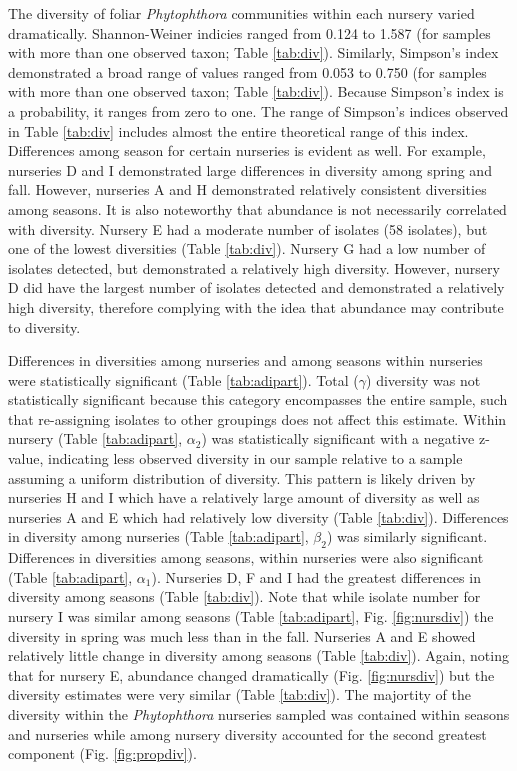 \documentclass[12pt]{article}
\begin{document}
The diversity of foliar \emph{Phytophthora} communities within each nursery varied dramatically.  Shannon-Weiner indicies ranged from 0.124 to 1.587 (for samples with more than one observed taxon; Table \ref{tab:div}).  Similarly, Simpson's index demonstrated a broad range of values ranged from 0.053 to 0.750 (for samples with more than one observed taxon; Table \ref{tab:div}).  Because Simpson's index is a probability, it ranges from zero to one.  The range of Simpson's indices observed in Table \ref{tab:div} includes almost the entire theoretical range of this index.  Differences among season for certain nurseries is evident as well.  For example, nurseries D and I demonstrated large differences in diversity among spring and fall.  However, nurseries A and H demonstrated relatively consistent diversities among seasons.  It is also noteworthy that abundance is not necessarily correlated with diversity.  Nursery E had a moderate number of isolates (58 isolates), but one of the lowest diversities (Table \ref{tab:div}).  Nursery G had a low number of isolates detected, but demonstrated a relatively high diversity.  However, nursery D did have the largest number of isolates detected and demonstrated a relatively high diversity, therefore complying with the idea that abundance may contribute to diversity.

Differences in diversities among nurseries and among seasons within nurseries were statistically significant (Table \ref{tab:adipart}).  Total ($\gamma$)  diversity was not statistically significant because this category encompasses the entire sample, such that re-assigning isolates to other groupings does not affect this estimate.  Within nursery (Table \ref{tab:adipart}, $\alpha_{2}$) was statistically significant with a negative z-value, indicating less observed diversity in our sample relative to a sample assuming a uniform distribution of diversity.  This pattern is likely driven by nurseries H and I which have a relatively large amount of diversity as well as nurseries A and E which had relatively low diversity (Table \ref{tab:div}).  Differences in diversity among nurseries (Table \ref{tab:adipart}, $\beta_{2}$) was similarly significant.  Differences in diversities among seasons, within nurseries were also significant (Table \ref{tab:adipart}, $\alpha_{1}$).  Nurseries D, F and I had the greatest differences in diversity among seasons (Table \ref{tab:div}).  Note that while isolate number for nursery I was similar among seasons (Table \ref{tab:adipart}, Fig. \ref{fig:nursdiv}) the diversity in spring was much less than in the fall.  Nurseries A and E showed relatively little change in diversity among seasons (Table \ref{tab:div}).  Again, noting that for nursery E, abundance changed dramatically (Fig. \ref{fig:nursdiv}) but the diversity estimates were very similar (Table \ref{tab:div}).  The majortity of the diversity within the \emph{Phytophthora} nurseries sampled was contained within seasons and nurseries while among nursery diversity accounted for the second greatest component (Fig. \ref{fig:propdiv}).
\end{document}

